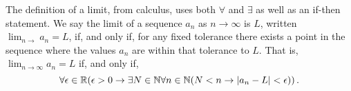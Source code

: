 \guard




\begin{exmp}
\label{exmp:limit}
  The definition of a limit, from calculus, uses both $\forall$ and $\exists$ as well as an if-then statement.
  We say the limit of a sequence $a_n$ as $n\to\infty$ is $L$, written $\lim_{n\to} a_n = L$, if, and only if, for any fixed tolerance there exists a point in the sequence where the values $a_n$ are within that tolerance to $L$.
  That is, $\lim_{n\to\infty}a_n=L$ if, and only if, \[\forall\epsilon\in\mathbb{R}(\epsilon>0\rightarrow\exists N\in\mathbb{N}\forall n\in\mathbb{N}(N<n\rightarrow\vert a_n-L\vert < \epsilon))\,.\]
\end{exmp}
